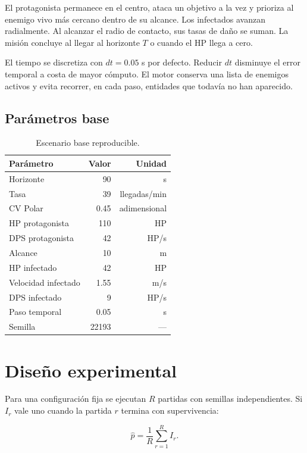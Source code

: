 \documentclass[12pt,a4paper]{article}
\begin{document}
El protagonista permanece en el centro, ataca un objetivo a la vez y prioriza
al enemigo vivo m\'as cercano dentro de su alcance. Los infectados avanzan
radialmente. Al alcanzar el radio de contacto, sus tasas de da\~no se suman. La
misi\'on concluye al llegar al horizonte $T$ o cuando el HP llega a cero.

El tiempo se discretiza con $dt=0.05$ s por defecto. Reducir $dt$ disminuye el
error temporal a costa de mayor c\'omputo. El motor conserva una lista de
enemigos activos y evita recorrer, en cada paso, entidades que todav\'ia no han
aparecido.

\subsection{Par\'ametros base}

\begin{table}[H]
\centering
\caption{Escenario base reproducible.}
\begin{tabular}{lrr}
\toprule
Par\'ametro & Valor & Unidad \\
\midrule
Horizonte & 90 & s \\
Tasa & 39 & llegadas/min \\
CV Polar & 0.45 & adimensional \\
HP protagonista & 110 & HP \\
DPS protagonista & 42 & HP/s \\
Alcance & 10 & m \\
HP infectado & 42 & HP \\
Velocidad infectado & 1.55 & m/s \\
DPS infectado & 9 & HP/s \\
Paso temporal & 0.05 & s \\
Semilla & 22193 & --- \\
\bottomrule
\end{tabular}
\end{table}

\section{Dise\~no experimental}

Para una configuraci\'on fija se ejecutan $R$ partidas con semillas independientes.
Si $I_r$ vale uno cuando la partida $r$ termina con supervivencia:

\begin{equation}
\widehat p=\frac{1}{R}\sum_{r=1}^{R}I_r.
\end{equation}
\end{document}

